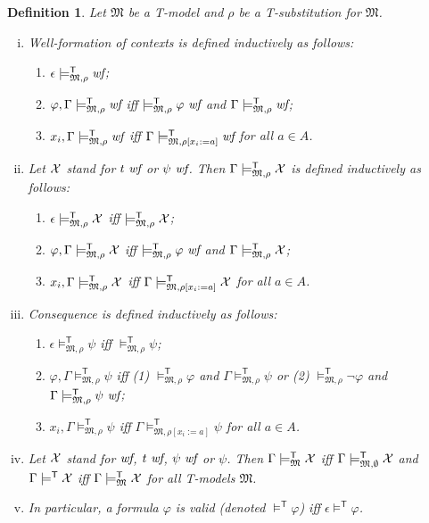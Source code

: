 \documentclass{article}
\newtheorem{definition}{Definition}[section]
\newcommand{\T}{\textsf T}
\newcommand{\ok}{\mbox{\em wf}}
\newcommand{\wf}{\ \mbox{\em wf}}
\newcommand{\mymodels}[1]{\ensuremath{\models^{\mathsf{#1}}}}
\newcommand{\mymodelsm}[2]{\ensuremath{\models_{\mathfrak{#2}}^{\mathsf{#1}}}}
\newcommand{\mymodelss}[3]{\ensuremath{\models_{\mathfrak{#2},{#3}}^{\mathsf{#1}}}}
\newcommand{\yields}[1]{\ensuremath{\models^{\mathsf{#1}}}}
\begin{document}
\begin{definition}\label{defn:Tconsequence}
Let $\mathfrak M$ be a {\T}-model and $\rho$ be a {\T}-substitution for
$\mathfrak M$.
\begin{enumerate}[(i)]
\item Well-formation of contexts is defined inductively as follows:
\begin{enumerate}
\item $\epsilon\mymodelss{T}M\rho\ok$;
\item $\varphi,\Gamma\mymodelss{T}M\rho\ok$ iff
$\mymodelss{T}M\rho\varphi\wf$ and $\Gamma\mymodelss{T}M\rho\ok$;
\item $x_i,\Gamma\mymodelss{T}M\rho\ok$ iff
$\Gamma\mymodelss{T}M{\rho[x_i:=a]}\ok$ for all $a\in A$.
\end{enumerate}
\item Let $\cal X$ stand for $t\wf$ or $\psi\wf$.  Then
$\Gamma\mymodelss{T}M\rho\cal X$ is defined inductively as follows:
\begin{enumerate}
\item $\epsilon\mymodelss{T}M\rho\cal X$ iff $\mymodelss{T}M\rho\cal X$;
\item $\varphi,\Gamma\mymodelss{T}M\rho\cal X$ iff
$\mymodelss{T}M\rho\varphi\wf$ and $\Gamma\mymodelss{T}M\rho\cal X$;
\item $x_i,\Gamma\mymodelss{T}M\rho\cal X$ iff
$\Gamma\mymodelss{T}M{\rho[x_i:=a]}\cal X$ for all $a\in A$.
\end{enumerate}
\item Consequence is defined inductively as follows:
\begin{enumerate}
\item $\epsilon\mymodelss{T}M\rho\psi$ iff $\mymodelss{T}M\rho\psi$;
\item $\varphi,\Gamma\mymodelss{T}M\rho\psi$ iff
(1) $\mymodelss{T}M\rho\varphi$ and $\Gamma\mymodelss{T}M\rho\psi$ or
(2) $\mymodelss{T}M\rho\neg\varphi$ and $\Gamma\mymodelss{T}M\rho\psi\wf$;
\item $x_i,\Gamma\mymodelss{T}M\rho\psi$ iff
$\Gamma\mymodelss{T}M{\rho[x_i:=a]}\psi$ for all $a\in A$.
\end{enumerate}
\item Let $\cal X$ stand for $\ok$, $t\wf$, $\psi\wf$ or $\psi$.  Then
$\Gamma\mymodelsm{T}M\cal X$ iff $\Gamma\mymodelss{T}M\emptyset\cal X$
and $\Gamma\yields{T}\cal X$ iff $\Gamma\mymodelsm{T}M\cal X$ for all
{\T}-models $\mathfrak M$.
\item In particular, a formula $\varphi$ is valid (denoted
$\mymodels{T}\varphi$) iff $\epsilon\yields{T}\varphi$.
\end{enumerate}
\end{definition}
\end{document}
